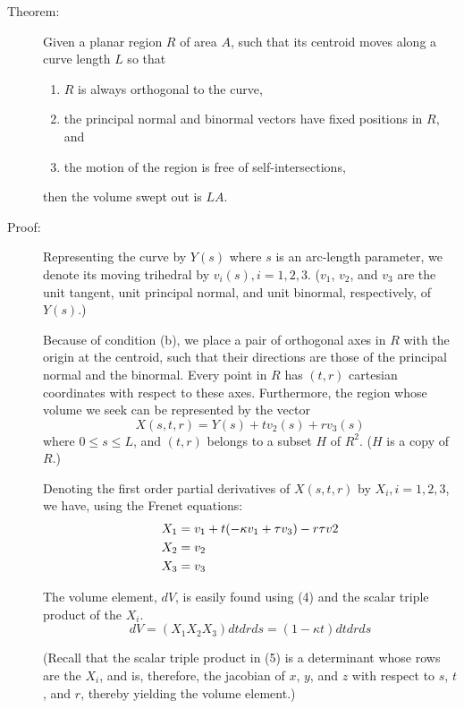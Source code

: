 \documentclass{book}
\begin{document}
\begin{description}
\item[Theorem:] Given a planar region $R$ of area $A$, such that its centroid moves along a curve length $L$ so that
  \begin{enumerate}[\hspace{1cm}a)]
    \item $R$ is always orthogonal to the curve,
    \item the principal normal and binormal vectors have fixed positions in $R$, and
    \item the motion of the region is free of self-intersections, 
  \end{enumerate}
  then the volume swept out is $LA$.

\item[Proof:] Representing the curve by $Y(s)$ where $s$ is an arc-length parameter, we denote its moving trihedral by $v_{i}(s), i = 1,2,3$. ($v_{1}$, $v_{2}$, and $v_{3}$ are the unit tangent, unit principal normal, and unit binormal, respectively, of $Y(s)$.)

  Because of condition (b), we place a pair of orthogonal axes in $R$ with the origin at the centroid, such that their directions are those of the principal normal and the binormal. Every point in $R$ has $(t,r)$ cartesian coordinates with respect to these axes. Furthermore, the region whose volume we seek can be represented by the vector
  \begin{equation}
  X(s,t,r) = Y(s) + tv_{2}(s) + rv_{3}(s)
  \end{equation}
  where $0 \leq s \leq L$, and $(t,r)$ belongs to a subset $H$ of $R^{2}$. ($H$ is a copy of $R$.)

  Denoting the first order partial derivatives of $X(s,t,r)$ by $X_{i}, i = 1, 2, 3$, we have, using the Frenet equations:
  \begin{align}
  X_{1} & = v_{1} + t (- \kappa v_{1} + \tau v_{3} ) - r \tau v{2} \notag \\
  X_{2} & = v_{2} \\
  X_{3} & = v_{3} \notag
  \end{align}

  The volume element, $dV$, is easily found using (4) and the scalar triple product of the $X_{i}$.
  \begin{equation}
  dV = (X_{1} X_{2} X_{3}) dt dr ds = (1 - \kappa t) dt dr ds
  \end{equation}

  (Recall that the scalar triple product in (5) is a determinant whose rows are the $X_{i}$, and is, therefore, the jacobian of $x$, $y$, and $z$ with respect to $s$, $t$, and $r$, thereby yielding the volume element.)


\end{description}
\end{document}
